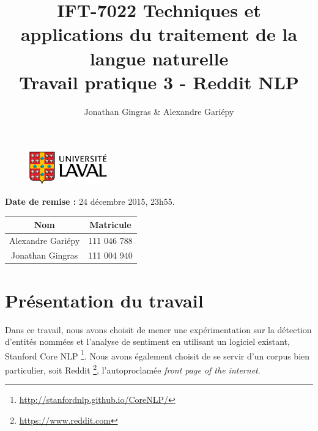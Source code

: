 \documentclass[12pt]{article}
\begin{document}
\begin{figure}
  \centering
  \vspace{1cm}
  \includegraphics[width=0.3\textwidth]{fig/u_Laval}
  \vspace{1cm}
\end{figure}
\vspace{2cm}
\title{\Large{IFT-7022 Techniques et applications du traitement de la langue naturelle} \\ Travail pratique 3 - Reddit NLP}
\author{Jonathan Gingras \& Alexandre Gariépy}
\date{}
\maketitle
\vspace{3cm}
\begin{center}
  \textbf{Date de remise :} 24 décembre 2015, 23h55.
\end{center}
\begin{center}
\end{center}
\begin{center}
  \begin{tabular}{|c|c|}              \hline
    Nom               & Matricule   \\\hline
    Alexandre Gariépy & 111 046 788 \\\hline
    Jonathan Gingras  & 111 004 940 \\\hline
  \end{tabular}
\end{center}

\clearpage


\section{Présentation du travail}
Dans ce travail, nous avons choisit de mener une expérimentation sur la détection d'entités nommées et l'analyse de sentiment en utilisant un logiciel existant, Stanford Core NLP \footnote{\url{http://stanfordnlp.github.io/CoreNLP/}}. Nous avons également choisit de se servir d'un corpus bien particulier, soit Reddit \footnote{\url{https://www.reddit.com}}, l'autoproclamée \textit{front page of the internet}.\\
\end{document}
